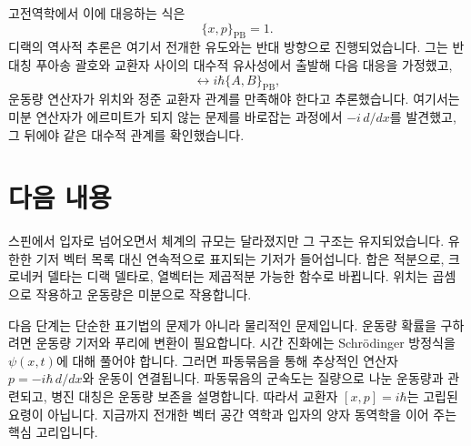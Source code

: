 고전역학에서 이에 대응하는 식은
\begin{equation}
\{x,p\}_{\mathrm{PB}}=1.
\end{equation}
디랙의 역사적 추론은 여기서 전개한 유도와는 반대 방향으로 진행되었습니다. 그는 반대칭 푸아송 괄호와 교환자 사이의 대수적 유사성에서 출발해 다음 대응을 가정했고,
\begin{equation}
[A,B]\longleftrightarrow i\hbar\{A,B\}_{\mathrm{PB}},
\end{equation}
운동량 연산자가 위치와 정준 교환자 관계를 만족해야 한다고 추론했습니다. 여기서는 미분 연산자가 에르미트가 되지 않는 문제를 바로잡는 과정에서 \(-i\,d/dx\)를 발견했고, 그 뒤에야 같은 대수적 관계를 확인했습니다.

\begin{classroomqa}
\end{classroomqa}

\section{다음 내용}

스핀에서 입자로 넘어오면서 체계의 규모는 달라졌지만 그 구조는 유지되었습니다. 유한한 기저 벡터 목록 대신 연속적으로 표지되는 기저가 들어섭니다. 합은 적분으로, 크로네커 델타는 디랙 델타로, 열벡터는 제곱적분 가능한 함수로 바뀝니다. 위치는 곱셈으로 작용하고 운동량은 미분으로 작용합니다.

다음 단계는 단순한 표기법의 문제가 아니라 물리적인 문제입니다. 운동량 확률을 구하려면 운동량 기저와 푸리에 변환이 필요합니다. 시간 진화에는 Schr\"odinger 방정식을 \(\psi(x,t)\)에 대해 풀어야 합니다. 그러면 파동묶음을 통해 추상적인 연산자 \(p=-i\hbar\,d/dx\)와 운동이 연결됩니다. 파동묶음의 군속도는 질량으로 나눈 운동량과 관련되고, 병진 대칭은 운동량 보존을 설명합니다. 따라서 교환자 \([x,p]=i\hbar\)는 고립된 요령이 아닙니다. 지금까지 전개한 벡터 공간 역학과 입자의 양자 동역학을 이어 주는 핵심 고리입니다.
